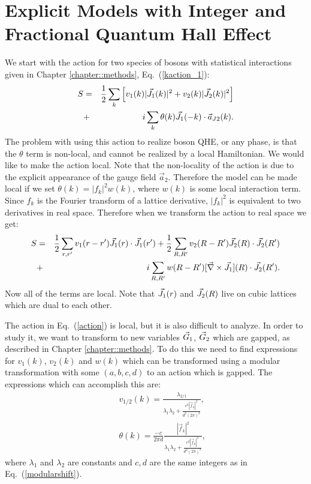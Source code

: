 \section{Explicit Models with Integer and Fractional Quantum Hall Effect}
\label{sec::demon} 

We start with the action for two species of bosons with statistical interactions given in Chapter \ref{chapter::methods}, Eq.~(\ref{kaction_1}):
\begin{eqnarray}
S&=&\frac{1}{2}\sum_k \left[v_1(k)|\vec{J}_1(k)|^2+v_2(k)|\vec{J}_2(k)|^2\right]\nonumber\\
&+&i\sum_k \theta(k)\vec{J}_1(-k)\cdot \vec{a}_{J2}(k).
\label{kaction_2}
\end{eqnarray}
The problem with using this action to realize boson QHE, or any phase, is that the $\theta$ term is non-local, and cannot be realized by a local Hamiltonian. We would like to make the action local. Note that the non-locality of the action is due to the explicit appearance of the gauge field $\vec{a}_2$. Therefore the model can be made local if we set $\theta(k)=|f_k|^2 w(k)$, where $w(k)$ is some local interaction term. Since $f_k$ is the Fourier transform of a lattice derivative, $|f_k|^2$ is equivalent to two derivatives in real space. Therefore when we transform the action to real space we get:
\begin{eqnarray}
S&=&\frac{1}{2} \sum_{r,r'} v_1(r-r')\vec{J}_1(r)\cdot\vec{J}_1(r')
+\frac{1}{2}\sum_{R,R'} v_2(R-R')\vec{J}_2(R)\cdot\vec{J}_2(R')\nonumber\\
&+&i\sum_{R,R'}  w(R-R')[\vec{\nabla}\times\vec{J}_1](R)\cdot\vec{J}_2(R').
\label{action}
\end{eqnarray}
Now all of the terms are local. Note that $\vec{J}_1(r)$ and $\vec{J}_2(R)$ live on cubic lattices which are dual to each other. 

The action in Eq.~(\ref{action}) is local, but it is also difficult to analyze. In order to study it, we want to transform to new variables $\vec{G}_1$, $\vec{G}_2$ which are gapped, as described in Chapter \ref{chapter::methods}. To do this we need to find expressions for $v_1(k)$, $v_2(k)$ and $w(k)$ which can be transformed using a modular transformation with some $(a,b,c,d)$ to an action which is gapped. The expressions which can accomplish this are: 
\begin{eqnarray}
&&v_{1/2}(k)=\frac{\lambda_{2/1}}{\lambda_1\lambda_2+\frac{c^2|\vec{f}_k|^2}{d^2(2\pi)^2}}, \label{vintro}\\
&&\theta(k)=\frac{-c}{2\pi d}\frac{|\vec{f}_k|^2}{\lambda_1\lambda_2+\frac{c^2|\vec{f}_k|^2}{d^2(2\pi)^2}},\label{tintro}
\end{eqnarray}
where $\lambda_1$ and $\lambda_2$ are constants and $c,d$ are the same integers as in Eq.~(\ref{modularshift}).

